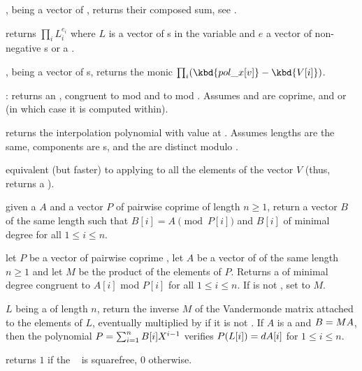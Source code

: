 ,  being a vector of ,
returns their composed sum, see .

 returns
$\prod_i L_i^{e_i}$ where $L$ is a vector of s in the variable 
and $e$ a vector of non-negative s or a .

,  being a vector
of s, returns the monic 
$\prod_i (\kbd{pol\_x[v]} - \kbd{V[i]})$.

:
returns an , congruent to  mod  and to  mod
. Assumes  and  are coprime, and 
or  (in which case it is computed within).

 returns the 
interpolation polynomial with value  at . Assumes lengths
are the same, components are s, and the  are distinct
modulo .

 equivalent (but
faster) to applying  to all the elements of the
vector $V$ (thus, returns a ).

given a  $A$ and a vector $P$ of pairwise coprime  of length
$n\ge 1$, return a vector $B$ of the same length such that $B[i] =
A\pmod{P[i]}$ and $B[i]$ of minimal degree for all $1\leq i\leq n$.

let $P$ be a vector of pairwise coprime , let $A$ be a vector of
 of the same length $n\ge 1$ and let $M$ be the product of the
elements of $P$. Returns a  of minimal degree congruent to $A[i]$ mod
$P[i]$ for all $1\leq i\leq n$.
If  is not , set  to $M$.

 $L$ being a 
of length $n$, return the inverse $M$ of the Vandermonde matrix attached to
the elements of $L$, eventually multiplied by  if it is not
. If $A$ is a  and $B=M\*A$, then the polynomial
$P=\sum_{i=1}^n B[i]\*X^{i-1}$ verifies $P(L[i])=d\*A[i]$ for
$1 \leq i \leq n$.

 returns $1$ if the
~ is squarefree, $0$ otherwise.


